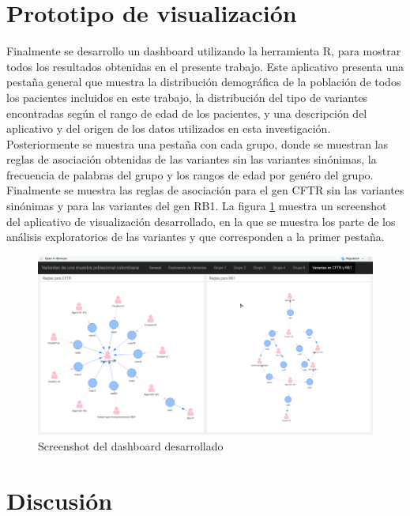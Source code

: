 \section{Prototipo de visualización}

Finalmente se desarrollo un dashboard utilizando la herramienta R, para mostrar todos los resultados obtenidas en el presente trabajo. Este aplicativo presenta una pestaña general que muestra la distribución demográfica de la población de todos los pacientes incluidos en este trabajo, la distribución del tipo de variantes encontradas según el rango de edad de los pacientes, y una descripción del aplicativo y del origen de los datos utilizados en esta investigación. Posteriormente se muestra una pestaña con cada grupo, donde se muestran las reglas de asociación obtenidas de las variantes sin las variantes sinónimas, la frecuencia de palabras del grupo y los rangos de edad por genéro del grupo. Finalmente se muestra las reglas de asociación para el gen CFTR  sin las variantes sinónimas y para las variantes del gen RB1. La figura \ref{fig:dash} muestra un screenshot  del aplicativo de visualización desarrollado, en la que se muestra los parte de los análisis exploratorios de las variantes y que corresponden a la primer pestaña. 

\begin{figure}[H]
	\centering
	\includegraphics[width=1\textwidth]{Kap4/dash}
	\caption{Screenshot del dashboard desarrollado} \label{fig:dash}
\end{figure}

\section{Discusión}

